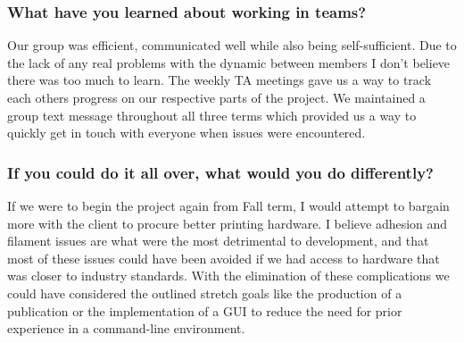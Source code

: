 \subsubsection{What have you learned about working in teams?}
Our group was efficient, communicated well while also being self-sufficient. Due to the lack of any real problems with the dynamic between members I don't believe there was too much to learn. The weekly TA meetings gave us a way to track each others progress on our respective parts of the project. We maintained a group text message throughout all three terms which provided us a way to quickly get in touch with everyone when issues were encountered. 
\subsubsection{If you could do it all over, what would you do differently?}
If we were to begin the project again from Fall term, I would attempt to bargain more with the client to procure better printing hardware. I believe adhesion and filament issues are what were the most detrimental to development, and that most of these issues could have been avoided if we had access to hardware that was closer to industry standards. With the elimination of these complications we could have considered the outlined stretch goals like the production of a publication or the implementation of a GUI to reduce the need for prior experience in a command-line environment.